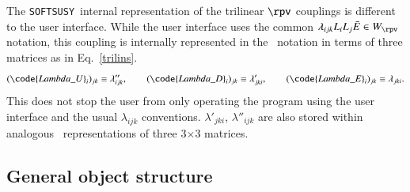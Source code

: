 \documentclass[final,3p,times,pdflatex]{elsarticle}
\def\SOFTSUSY{{\tt SOFTSUSY}}
\begin{document}
The \SOFTSUSY~internal representation of the trilinear $\rpv$ couplings
is different to the user interface. While the user interface uses the
common $\lambda_{ijk} L_i L_j \bar E \in W_{\rpv}$ notation, this coupling is
internally represented in the \cite{Allanach:2003eb} ~notation in
terms of 
three matrices as in Eq.~\ref{trilins}. 
\begin{equation}
(\code{Lambda\_U}_i)_{jk}\equiv \lambda''_{ijk}, \qquad
(\code{Lambda\_D}_i)_{jk} \equiv \lambda'_{jki}, \qquad
(\code{Lambda\_E}_i)_{jk} \equiv \lambda_{jki}. \label{trilins}
\end{equation}
This does not stop
the user from only operating 
the program using the user interface and the usual $\lambda_{ijk}$ conventions.
$\lambda'_{jki}$, $\lambda''_{ijk}$ are also stored within analogous
~representations of three 3$\times$3 matrices. 

\subsection{General object structure}
\end{document}

